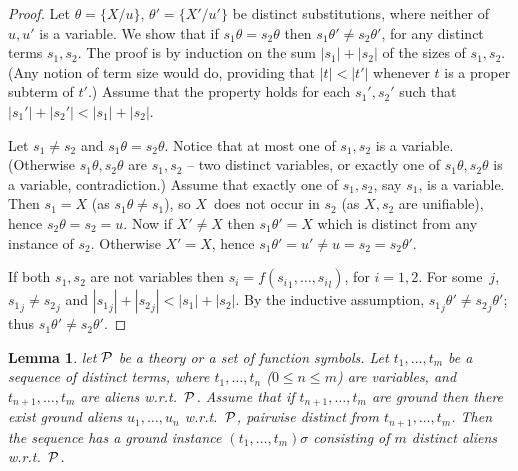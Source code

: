 \documentclass[a4paper]{tlp2}
\newtheorem{lemma}[theorem]{Lemma}
\newcommand*{\seq}[2][n]  {{#2_{1}, \allowbreak \ldots, \allowbreak #2_{#1}}}
\newcommand*{\SEQ}[3]
            {{\ensuremath{#1_{#2}, \allowbreak \ldots, \allowbreak #1_{#3}}}}
\renewcommand*{\P}{{\ensuremath{\cal P}}\xspace}
\begin{document}
\begin{proof}


Let $\theta=\{X/u\}$,  $\theta'=\{X'/u'\}$ be distinct substitutions,
where neither of $u,u'$ is a variable.
We show that if $s_1\theta=s_2\theta$ then  $s_1\theta'\neq s_2\theta'$, 
for any distinct terms $s_1,s_2$.
The proof is
by induction on the sum $|s_1|+|s_2|$ of the sizes of $s_1,s_2$.
(Any notion of term size would do, providing that $|t|<|t'|$ whenever $t$ is
a proper subterm of $t'$.)
Assume that the
property holds for each  $s_1',s_2'$ such that $|s_1'|+|s_2'|<|s_1|+|s_2|$.

Let $s_1\neq s_2$ and $s_1\theta=s_2\theta$.
Notice that at most one of  $s_1,s_2$ is a variable.
(Otherwise $s_1\theta,s_2\theta$ are $s_1,s_2$ -- two distinct variables,
 or exactly one of  $s_1\theta,s_2\theta$ is a variable, contradiction.)
Assume that exactly one of $s_1,s_2$, say $s_1$, is a variable.
Then $s_1=X$ (as $s_1\theta\neq s_1$), so
$X$~does not occur in $s_2$ (as $X,s_2$ are unifiable),
hence $s_2\theta=s_2=u$.
Now if $X'\neq X$ then $s_1\theta'=X$ which is distinct from any instance of
$s_2$.  Otherwise  $X'= X$, hence $s_1\theta'=u'\neq u=s_2=s_2\theta'$.

If both $s_1,s_2$ are not variables then
$s_i=f(\seq[l]{{s_i}})$, for $i=1,2$.  For some~$j$, ${s_1}_j\neq{s_2}_j$
and $|{s_1}_j|+|{s_2}_j|<|{s_1}|+|{s_2}|$.
By the inductive assumption, 
${s_1}_j\theta'\neq{s_2}_j\theta'$;
thus ${s_1}\theta'\neq{s_2}\theta'$.
\end{proof}



\begin{lemma}
\label{lemma:distinct}
let \P be a theory or a set of function symbols.
Let $\seq[m]t$ be a sequence of distinct terms, where $\seq t$ 
($0\leq n \leq m$) are variables, and  $\SEQ t{n+1}m$ are aliens w.r.t.~$\P$.
Assume that if  $\SEQ t{n+1}m$ are ground then there exist ground
aliens $\seq u$ w.r.t.\ $\P$, pairwise distinct from  $\SEQ t{n+1}m$.
Then the sequence has
a ground instance $(\seq[m]t)\sigma$ consisting of $m$ distinct aliens
w.r.t.\ $\P$. 
\end{lemma}
\nopagebreak
\end{document}
